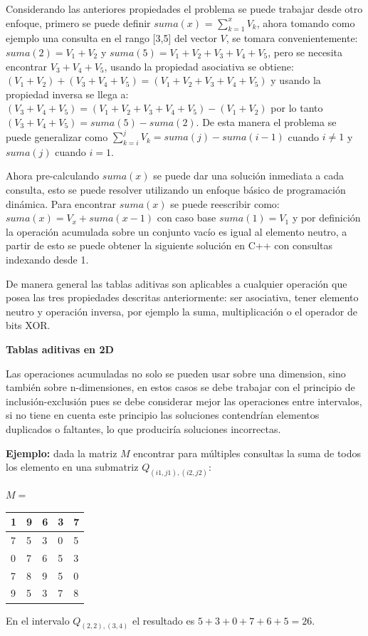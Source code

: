 \documentclass[12pt, a4paper]{article}
\newcommand\cppfile[2][]{

}
\newcommand{\subtitulo}[1]{\begin{center}\textbf{#1}\end{center}}
\begin{document}
	Considerando las anteriores propiedades el problema se puede trabajar desde otro enfoque, primero se puede
	definir $suma(x)$ = $\sum_{k=1}^{x} V_{k}$, ahora tomando como ejemplo una consulta en el rango [3,5] 
	del vector $V$, se tomara convenientemente: $suma(2) = V_{1}+V_{2}$ y $suma(5) = V_{1}+V_{2}+V_{3}+V_{4}+V_{5}$,
	pero se necesita encontrar $V_{3}+V_{4}+V_{5}$, usando la propiedad asociativa se obtiene: 
	$(V_{1}+V_{2})+(V_{3}+V_{4}+V_{5})=(V_{1}+V_{2}+V_{3}+V_{4}+V_{5})$ y usando la propiedad inversa se llega a:
	$(V_{3}+V_{4}+V_{5})=(V_{1}+V_{2}+V_{3}+V_{4}+V_{5})-(V_{1}+V_{2})$ por lo tanto 
	$(V_{3}+V_{4}+V_{5})=suma(5)-suma(2)$. De esta manera el problema se puede generalizar como 
	$\sum_{k=i}^{j} V_{k} = suma(j) - suma(i-1)$ cuando $i \neq 1$ y $suma(j)$ cuando $i=1$.
	
	Ahora pre-calculando $suma(x)$ se puede dar una solución inmediata a cada consulta, esto se puede resolver 
	utilizando un enfoque básico de programación dinámica. Para encontrar $suma(x)$ se puede reescribir como: 
	$suma(x) = V_{x} + suma(x-1)$ con caso base $suma(1)=V_{1}$ y por definición la operación acumulada sobre un 
	conjunto vacío es igual al elemento neutro, a partir de esto se puede obtener la siguiente solución en 
	C++ con consultas indexando desde 1.
	\cppfile[6-14]{codigos/tablas_aditivas.cpp}
	
	De manera general las tablas aditivas son aplicables a cualquier operación que posea las tres propiedades 
	descritas anteriormente: ser asociativa, tener elemento neutro y operación inversa, por ejemplo la suma,
	multiplicación o el operador de bits XOR.

	\subtitulo{Tablas aditivas en 2D}
	
	Las operaciones acumuladas no solo se pueden usar sobre una dimension, sino también sobre n-dimensiones, en estos
	casos se debe trabajar con el principio de inclusión-exclusión pues se debe considerar mejor las operaciones entre
	intervalos, si no tiene en cuenta este principio las soluciones contendrían elementos duplicados o faltantes, lo 
	que produciría soluciones incorrectas.
	
	\textbf{Ejemplo:} dada la matriz $M$ encontrar para múltiples consultas la suma de todos los elemento en una
	submatriz $Q_{(i1,j1),(i2,j2)}$:
	\begin{center}
		$M = $
		\begin{tabular}{|l|l|l|l|l|}
			\hline
			1  &9  &6 &3 &7\\ \hline
			7  &5  &3 &0 &5\\ \hline
			0  &7  &6 &5 &3\\ \hline
			7  &8  &9 &5 &0\\ \hline
			9  &5  &3 &7 &8\\ \hline
		\end{tabular}
	\end{center}
	En el intervalo $Q_{(2,2),(3,4)}$ el resultado es $5+3+0+7+6+5=26$.
\end{document}
